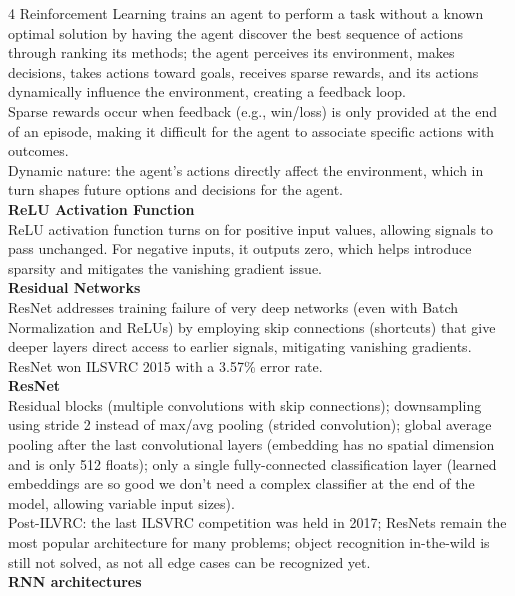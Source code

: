 \documentclass[8pt]{extarticle}
\begin{document}
\begin{multicols}{4}
{Reinforcement Learning trains an agent to perform a task without a known optimal solution by having the agent discover the best sequence of actions through ranking its methods; the agent perceives its environment, makes decisions, takes actions toward goals, receives sparse rewards, and its actions dynamically influence the environment, creating a feedback loop.\\
Sparse rewards occur when feedback (e.g., win/loss) is only provided at the end of an episode, making it difficult for the agent to associate specific actions with outcomes.\\
Dynamic nature: the agent's actions directly affect the environment, which in turn shapes future options and decisions for the agent.\\
\vspace{2pt}\textbf{ReLU Activation Function}\\
ReLU activation function turns on for positive input values, allowing signals to pass unchanged. For negative inputs, it outputs zero, which helps introduce sparsity and mitigates the vanishing gradient issue.\\
\vspace{2pt}\textbf{Residual Networks}\\
ResNet addresses training failure of very deep networks (even with Batch Normalization and ReLUs) by employing skip connections (shortcuts) that give deeper layers direct access to earlier signals, mitigating vanishing gradients.\\
ResNet won ILSVRC 2015 with a 3.57\% error rate.\\
\vspace{2pt}\textbf{ResNet}\\
Residual blocks (multiple convolutions with skip connections); downsampling using stride 2 instead of max/avg pooling (strided convolution); global average pooling after the last convolutional layers (embedding has no spatial dimension and is only 512 floats); only a single fully-connected classification layer (learned embeddings are so good we don't need a complex classifier at the end of the model, allowing variable input sizes).\\
Post-ILVRC: the last ILSVRC competition was held in 2017; ResNets remain the most popular architecture for many problems; object recognition in-the-wild is still not solved, as not all edge cases can be recognized yet.\\
\vspace{2pt}\textbf{RNN architectures}\\
}
\end{multicols}
\end{document}
